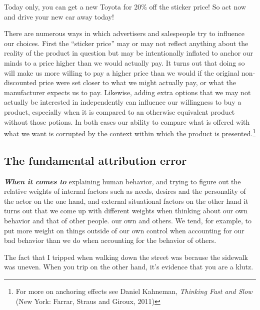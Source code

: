 \documentclass[
  12pt, openany]{book}
\theoremstyle{definition}
\theoremstyle{definition}
\theoremstyle{definition}
\theoremstyle{definition}
\theoremstyle{remark}
\begin{document}
\begin{center}

\begin{argument}
Today only, you can get a new Toyota for 20\% off the sticker price! So act now and drive your new car away today!

\end{argument}


\end{center}

There are numerous ways in which advertisers and salespeople try to influence our choices. First the ``sticker price'' may or may not reflect anything about the reality of the product in question but may be intentionally inflated to anchor our minds to a price higher than we would actually pay. It turns out that doing so will make us more willing to pay a higher price than we would if the original non-discounted price were set closer to what we might actually pay, or what the manufacturer expects us to pay. Likewise, adding extra options that we may not actually be interested in independently can influence our willingness to buy a product, especially when it is compared to an otherwise equivalent product without those potions. In both cases our ability to compare what is offered with what we want is corrupted by the context within which the product is presented.\footnote{For more on anchoring effects see Daniel Kahneman, \emph{Thinking Fast and Slow} (New York: Farrar, Straus and Giroux, 2011)}

\hypertarget{the-fundamental-attribution-error}{%
\subsection*{The fundamental attribution error}\label{the-fundamental-attribution-error}}


\textbf{\emph{When it comes to}} explaining human behavior, and trying to figure out the relative weights of internal factors such as needs, desires and the personality of the actor on the one hand, and external situational factors on the other hand it turns out that we come up with different weights when thinking about our own behavior and that of other people. our own and others. We tend, for example, to put more weight on things outside of our own control when accounting for our bad behavior than we do when accounting for the behavior of others.

\begin{center}

\begin{argument}
The fact that I tripped when walking down the street was because the sidewalk was uneven. When you trip on the other hand, it's evidence that you are a klutz.

\end{argument}


\end{center}
\end{document}
